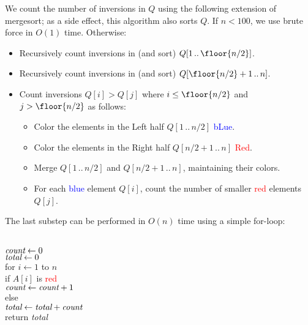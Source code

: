 \documentclass[11pt]{article}
\begin{document}
\begin{enumerate}
\begin{solution}
We count the number of inversions in $Q$ using the following extension of mergesort; as a side effect, this algorithm also sorts $Q$.  If $n < 100$, we use brute force in $O(1)$ time.  Otherwise:
\begin{itemize}\itemsep0pt
\item Recursively count inversions in (and sort) $Q[1\,..\,\floor{n/2}]$.
\item Recursively count inversions in (and sort) $Q[\floor{n/2}+1\,..\,n]$.
\item Count inversions $Q[i] > Q[j]$ where $i\le \floor{n/2}$ and $j>\floor{n/2}$ as follows:
\begin{itemize}\cramped
\item Color the elements in the Left half $Q[1\,..\,n/2]$ \textcolor{blue}{bLue}.
\item Color the elements in the Right half $Q[n/2+1\,..\,n]$ \textcolor{Red}{Red}.
\item Merge $Q[1\,..\,n/2]$ and $Q[n/2+1\,..\,n]$, maintaining their colors.
\item For each \textcolor{blue}{blue} element $Q[i]$, count the number of smaller \textcolor{Red}{red} elements $Q[j]$.
\end{itemize}
\end{itemize}
The last substep can be performed in $O(n)$ time using a simple for-loop:
\begin{algo}
	\+
\\	$\emph{count} \gets 0$
\\	$\emph{total} \gets 0$
\\[0.5ex]
	for $i\gets 1$ to $n$\+
\\		if $A[i]$ is \textcolor{Red}{red}\+
\\			$\emph{count} \gets \emph{count} + 1$\-
\\		else\+
\\			$\emph{total} \gets \emph{total} + \emph{count}$\-\-
\\[0.5ex]
	return \emph{total}
\end{algo}


\end{solution}
\end{enumerate}
\end{document}
